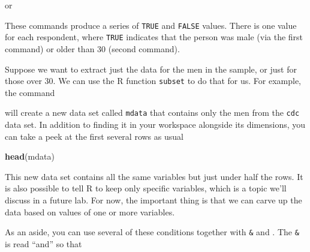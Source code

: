 \documentclass[]{book}
\newenvironment{Shaded}{\begin{snugshade}}{\end{snugshade}}
\newcommand{\KeywordTok}[1]{\textcolor[rgb]{0.13,0.29,0.53}{\textbf{#1}}}
\newcommand{\DecValTok}[1]{\textcolor[rgb]{0.00,0.00,0.81}{#1}}
\newcommand{\StringTok}[1]{\textcolor[rgb]{0.31,0.60,0.02}{#1}}
\newcommand{\OperatorTok}[1]{\textcolor[rgb]{0.81,0.36,0.00}{\textbf{#1}}}
\newcommand{\NormalTok}[1]{#1}
\theoremstyle{definition}
\theoremstyle{definition}
\theoremstyle{definition}
\theoremstyle{remark}
\begin{document}
\begin{Shaded}
\end{Shaded}

or

\begin{Shaded}
\end{Shaded}

These commands produce a series of \texttt{TRUE} and \texttt{FALSE}
values. There is one value for each respondent, where \texttt{TRUE}
indicates that the person was male (via the first command) or older than
30 (second command).

Suppose we want to extract just the data for the men in the sample, or
just for those over 30. We can use the R function \texttt{subset} to do
that for us. For example, the command

\begin{Shaded}
\end{Shaded}

will create a new data set called \texttt{mdata} that contains only the
men from the \texttt{cdc} data set. In addition to finding it in your
workspace alongside its dimensions, you can take a peek at the first
several rows as usual

\begin{Shaded}
\begin{Highlighting}[]
\KeywordTok{head}\NormalTok{(mdata)}
\end{Highlighting}
\end{Shaded}

This new data set contains all the same variables but just under half
the rows. It is also possible to tell R to keep only specific variables,
which is a topic we'll discuss in a future lab. For now, the important
thing is that we can carve up the data based on values of one or more
variables.

As an aside, you can use several of these conditions together with
\texttt{\&} and \texttt{\textbar{}}. The \texttt{\&} is read ``and'' so
that
\end{document}
